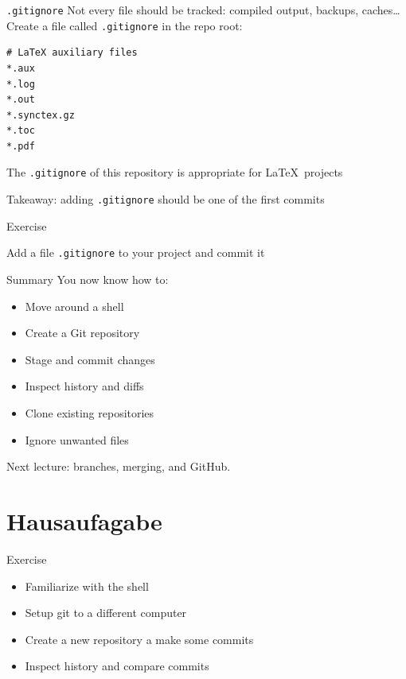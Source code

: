 \documentclass[11pt]{beamer}
\newcommand{\exercise}[1]{
  \begin{frame}{Exercise}
    #1
  \end{frame}
}
\begin{document}
\begin{frame}[fragile]{\texttt{.gitignore}}
  Not every file should be tracked: compiled output, backups, caches\ldots
  \vfill
  Create a file called \texttt{.gitignore} in the repo root:
\begin{lstlisting}
# LaTeX auxiliary files
*.aux
*.log
*.out
*.synctex.gz
*.toc
*.pdf
\end{lstlisting}
\vfill
The \texttt{.gitignore} of this repository is appropriate for \LaTeX\
projects

\vfill
Takeaway: adding \texttt{.gitignore} should be one of the first commits
\end{frame}

\exercise{
  Add a file \texttt{.gitignore} to your project and commit it
}


\begin{frame}{Summary}
  You now know how to:
  \begin{itemize}
    \item Move around a shell
    \item Create a Git repository
    \item Stage and commit changes
    \item Inspect history and diffs
    \item Clone existing repositories
    \item Ignore unwanted files
  \end{itemize}
  \vfill
  Next lecture: branches, merging, and GitHub.
\end{frame}



\section{Hausaufagabe}

\exercise{
  \begin{itemize}
  \item Familiarize with the shell
  \item Setup git to a different computer
  \item Create a new repository a make some commits
  \item Inspect history and compare commits
  \end{itemize}
}
\end{document}
